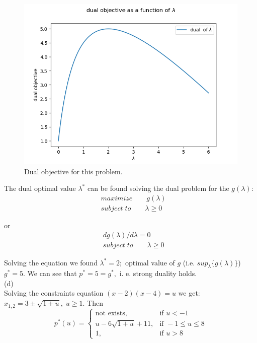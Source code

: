 \documentclass{article}
\begin{document}
\begin{figure}[h!]
	\includegraphics[width=\linewidth]{5_1_b_2.png}
	\caption{Dual objective for this problem.}
	\label{fig:5_1_b_2}
\end{figure}

The dual optimal value $\lambda ^*$ can be found solving the dual problem for the $g(\lambda):$
\begin{align*}
&maximize \qquad g(\lambda) \\
&subject \; to  \qquad \lambda \geq 0
\end{align*} 

or 
\begin{align*}
&d g(\lambda) / {d \lambda} = 0 \\
&subject \; to  \qquad \lambda \geq 0
\end{align*} 

Solving the equation we found $\lambda ^* = 2;$ optimal value of $g$ (i.e. $sup_\lambda \{g(\lambda)\}$) $g^* = 5.$
We can see that $p^* = 5 = g^*,$ i. e. strong duality holds.\\

(d) \\

Solving the constraints equation $(x - 2)(x - 4) = u$ we get:\\
$x_{1, 2} = 3 \pm \sqrt{1 + u}, \; u \geq 1.$ Then \\

\begin{equation}
p^*(u) =
\begin{cases}
	\text{not exists},			& \text{if } u < -1 \\
	u - 6 \sqrt{1 + u} + 11, 	& \text{if } - 1 \leq u \leq 8  \\
	1, 							& \text{if } u > 8
\end{cases}       
\end{equation}
\end{document}
